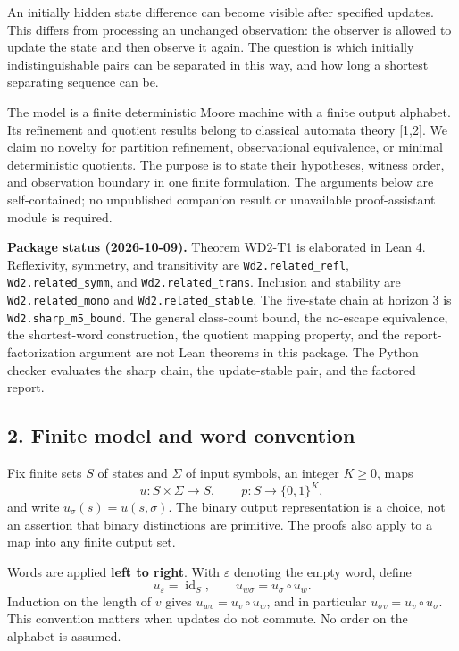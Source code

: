 \documentclass[
  11pt,
]{article}
\begin{document}
An initially hidden state difference can become visible after specified
updates. This differs from processing an unchanged observation: the
observer is allowed to update the state and then observe it again. The
question is which initially indistinguishable pairs can be separated in
this way, and how long a shortest separating sequence can be.

The model is a finite deterministic Moore machine with a finite output
alphabet. Its refinement and quotient results belong to classical
automata theory {[}1,2{]}. We claim no novelty for partition refinement,
observational equivalence, or minimal deterministic quotients. The
purpose is to state their hypotheses, witness order, and observation
boundary in one finite formulation. The arguments below are
self-contained; no unpublished companion result or unavailable
proof-assistant module is required.

\textbf{Package status (2026-10-09).} Theorem WD2-T1 is elaborated in
Lean 4. Reflexivity, symmetry, and transitivity are
\texttt{Wd2.related\_refl}, \texttt{Wd2.related\_symm}, and
\texttt{Wd2.related\_trans}. Inclusion and stability are
\texttt{Wd2.related\_mono} and \texttt{Wd2.related\_stable}. The
five-state chain at horizon 3 is \texttt{Wd2.sharp\_m5\_bound}. The
general class-count bound, the no-escape equivalence, the shortest-word
construction, the quotient mapping property, and the
report-factorization argument are not Lean theorems in this package. The
Python checker evaluates the sharp chain, the update-stable pair, and
the factored report.

\subsection{2. Finite model and word
convention}\label{finite-model-and-word-convention}

Fix finite sets \(S\) of states and \(\Sigma\) of input symbols, an
integer \(K\ge0\), maps \[
 u:S\times\Sigma\longrightarrow S,\qquad
 p:S\longrightarrow\{0,1\}^K,
\] and write \(u_\sigma(s)=u(s,\sigma)\). The binary output
representation is a choice, not an assertion that binary distinctions
are primitive. The proofs also apply to a map into any finite output
set.

Words are applied \textbf{left to right}. With \(\varepsilon\) denoting
the empty word, define \[
 u_\varepsilon=\operatorname{id}_S,\qquad
 u_{w\sigma}=u_\sigma\circ u_w.
\] Induction on the length of \(v\) gives \(u_{wv}=u_v\circ u_w\), and
in particular \(u_{\sigma v}=u_v\circ u_\sigma\). This convention
matters when updates do not commute. No order on the alphabet is
assumed.
\end{document}
